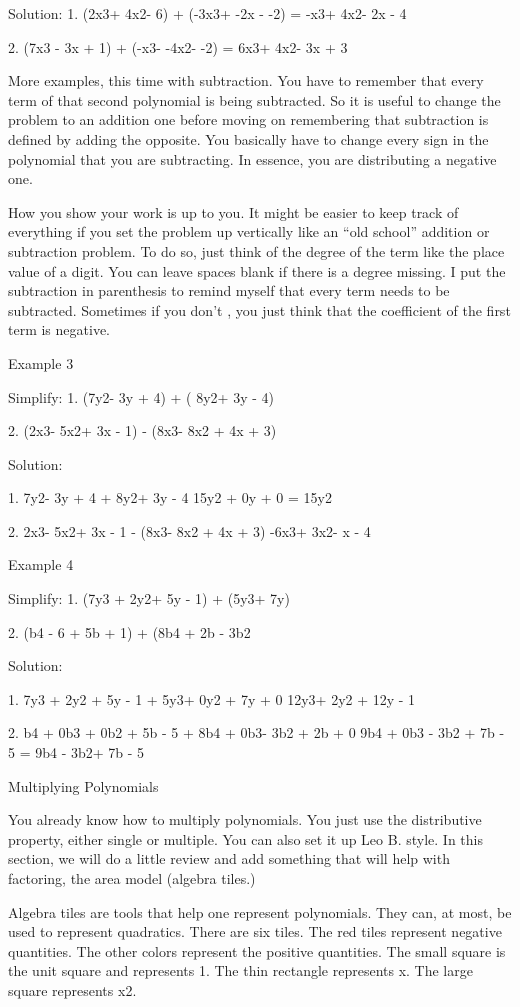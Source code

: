 Solution:
1. (2x3+ 4x2- 6) + (-3x3+ -2x - -2)
= -x3+ 4x2- 2x - 4

2. (7x3 - 3x + 1) + (-x3- -4x2- -2)
= 6x3+ 4x2- 3x + 3

More examples, this time with subtraction. You have to remember that every term of that second polynomial is being subtracted. So it is useful to change the problem to an addition one before moving on remembering that subtraction is defined by adding the opposite. You basically have to change every sign in the polynomial that you are subtracting. In essence, you are distributing a negative one.

How you show your work is up to you. It might be easier to keep track of everything if you set the problem up vertically like an ``old school'' addition or subtraction problem. To do so, just think of the degree of the term like the place value of a digit. You can leave spaces blank if there is a degree missing. I put the subtraction in parenthesis to remind myself that every term needs to be subtracted. Sometimes if you don't , you just think that the coefficient of the first term is negative.

Example 3

Simplify: 
1. (7y2- 3y + 4) + ( 8y2+ 3y - 4)

2. (2x3- 5x2+ 3x - 1) - (8x3- 8x2 + 4x + 3)


Solution:

1. 7y2- 3y + 4
 + 8y2+ 3y - 4
 15y2 + 0y + 0 = 15y2

2. 2x3- 5x2+ 3x - 1
 - (8x3- 8x2 + 4x + 3)
 -6x3+ 3x2- x - 4

Example 4

Simplify: 
1. (7y3 + 2y2+ 5y - 1) + (5y3+ 7y)

2. (b4 - 6 + 5b + 1) + (8b4 + 2b - 3b2


Solution:

1. 7y3 + 2y2 + 5y - 1
 + 5y3+ 0y2 + 7y + 0
 12y3+ 2y2 + 12y - 1

2. b4 + 0b3 + 0b2 + 5b - 5
 + 8b4 + 0b3- 3b2 + 2b + 0 
 9b4 + 0b3 - 3b2 + 7b - 5 = 9b4 - 3b2+ 7b - 5

Multiplying Polynomials

You already know how to multiply polynomials. You just use the distributive property, either single or multiple. You can also set it up Leo B. style. In this section, we will do a little review and add something that will help with factoring, the area model (algebra tiles.)
 
Algebra tiles are tools that help one represent polynomials. They can, at most, be used to represent quadratics. There are six tiles. The red tiles represent negative quantities. The other colors represent the positive quantities. The small square is the unit square and represents 1. The thin rectangle represents x. The large square represents x2.



